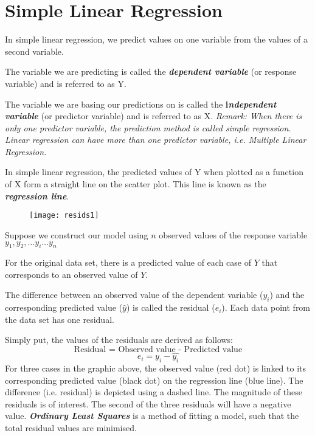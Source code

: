 

\Large	
\section{Simple Linear Regression}	
In simple linear regression, we predict values on one variable from the values of a second variable. 


The variable we are predicting is called the \textbf{\textit{dependent variable}} (or response variable) and is referred to as Y. 

The variable we are basing our predictions on is called the \textbf{i\textit{ndependent variable}} (or predictor variable) and is referred to as X.
 \textit{
Remark: When there is only one predictor variable, the prediction method is called simple regression. Linear regression can have more than one predictor variable, i.e. Multiple Linear Regression.}
\newpage


In simple linear regression, the predicted values of Y when plotted as a function of X form a straight line on the scatter plot. This line is known as the \textbf{\textit{regression line}}. 

\begin{figure}[h!]
\centering
\texttt{[image: resids1]}
\caption{}
\label{fig:resids1}
\end{figure}


Suppose we construct our model using $n$ observed values of the response variable $y_1, y_2, \ldots y_i \ldots y_n$

For the original data set, there is a predicted value of each case of $Y$ that corresponds to an observed value of $Y$. 

The difference between an observed value of the dependent variable ($y_i$) and the corresponding predicted value ($\hat{y}$) is called the residual ($e_i$). Each data point from the data set has one residual.

Simply put, the values of the residuals are derived as follows: 
\[\mbox{Residual = Observed value - Predicted value}\]
\[e_i = y_i - \hat{y_i} \]
For three cases in the graphic above, the observed value (red dot) is linked to its corresponding predicted value (black dot) on the regression line (blue line).
The difference (i.e. residual) is depicted using a dashed line. The magnitude of these residuals is of interest.
The second of the three residuals will have a negative value.
\textbf{\textit{Ordinary Least Squares}} is a method of fitting a model, such that the total residual values are minimised.


